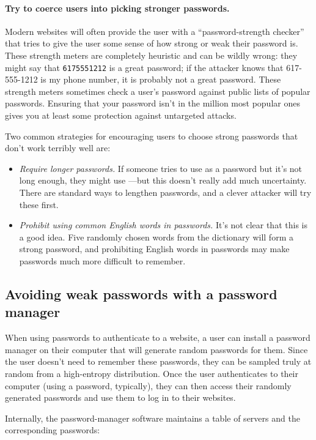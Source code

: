 \paragraph{Try to coerce users into picking stronger passwords.}
Modern websites will often provide the user with a ``password-strength checker''
that tries to give the user some sense of how strong or weak their password is.
These strength meters are completely heuristic and can be wildly wrong:
they might say that \texttt{6175551212} is a great password; if the attacker
knows that 617-555-1212 is my phone number, it is probably not a great password.
These strength meters sometimes check a user's password against public lists of 
popular passwords. Ensuring that your password isn't in the million most popular
ones gives you at least some protection against untargeted attacks.

Two common strategies for encouraging users to choose strong passwords
that don't work terribly well are:
\begin{itemize}
  \item \emph{Require longer passwords.} If someone tries to use 
     as a password but it's not long
    enough, they might use ---but
    this doesn't really add much uncertainty.
    There are standard ways to lengthen passwords,
    and a clever attacker will try these first.
  \item \emph{Prohibit using common English words in passwords.}
    It's not clear that this is a good idea.
    Five randomly chosen words from the dictionary will
    form a strong password, and prohibiting English words
    in passwords may make passwords much more difficult to remember.

\end{itemize}

\subsection{Avoiding weak passwords with a password manager}
When using passwords to authenticate to a website, 
a user can install a password manager on their
computer that will generate random passwords for them.
Since the user doesn't need to remember these passwords,
they can be sampled truly at random from a high-entropy distribution.
Once the user authenticates to their computer (using a password, typically), 
they can then access their randomly generated passwords and
use them to log in to their websites. 

Internally, the password-manager software maintains a table of 
servers and the corresponding passwords:

